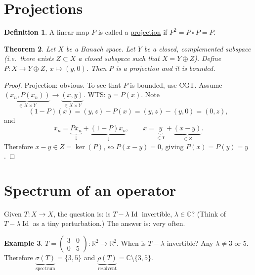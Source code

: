 \documentclass[12pt]{article}
\DeclareMathOperator{\Id}{Id}
\newcommand{\R}{\mathbb{R}}
\newcommand{\C}{\mathbb{C}}
\newtheorem{thm}{Theorem}[section]
\theoremstyle{definition}
\newtheorem{defn}[thm]{Definition}
\newtheorem{ex}[thm]{Example}
\begin{document}
\section{Projections}

\begin{defn}
	A linear map $P$ is called a \underline{projection} if $P^2 = P \circ P = P$.
\end{defn}

\begin{thm}
	Let $X$ be a Banach space.
	Let $Y$ be a closed, complemented subspace (i.e.\ there exists $Z \subset X$ a closed subspace such that $X = Y \oplus Z$).
	Define $P : X \to Y \oplus Z$, $x \mapsto (y,0)$.
	Then $P$ is a projection and it is bounded.
\end{thm}
\begin{proof}
	Projection: obvious.
	To see that $P$ is bounded, use CGT.
	Assume $\underbrace{(x_n, P(x_n))}_{\in X \times Y} \to \underbrace{(x,y)}_{\in X \times Y}$.
	WTS: $y = P(x)$.
	Note
	\begin{equation*}
		(1-P)(x) = (y,z) - P(x) = (y,z) - (y,0) = (0,z),
	\end{equation*}
	and
	\begin{equation*}
		x_n = \underbrace{Px_n}_{\downarrow} + \underbrace{(1-P)x_n}_{\downarrow}, \qquad x = \underbrace{y}_{\in Y} + \underbrace{(x-y)}_{\in Z}.
	\end{equation*}
	Therefore $x - y \in Z = \ker(P)$, so $P(x-y) = 0$, giving $P(x) = P(y) = y$.
\end{proof}

\section{Spectrum of an operator}

Given $T : X \to X$, the question is: is $T - \lambda \Id$ invertible, $\lambda \in \C$?
(Think of $T - \lambda \Id$ as a tiny perturbation.)
The answer is: very often.

\begin{ex}
	$T = \begin{pmatrix} 3 & 0 \\ 0 & 5 \end{pmatrix} : \R^2 \to \R^2$.
	When is $T - \lambda$ invertible?
	Any $\lambda \neq 3$ or $5$.
	Therefore $\underbrace{\sigma(T)}_{\text{spectrum}} = \lbrace 3, 5 \rbrace$ and $\underbrace{\rho(T)}_{\text{resolvent}} = \C \setminus \lbrace 3, 5 \rbrace$.
\end{ex}
\end{document}
